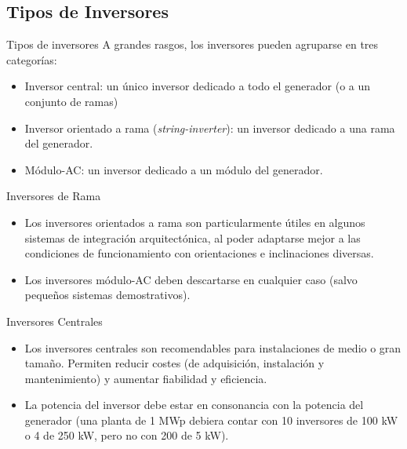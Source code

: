 \documentclass[xcolor={usenames,svgnames,dvipsnames}]{beamer}
\begin{document}
\subsection{Tipos de Inversores}
\label{sec-2-2}
\begin{frame}[label=sec-2-2-1]{Tipos de inversores}
A grandes rasgos, los inversores pueden agruparse en tres categorías:

\begin{itemize}
\item \alert{Inversor central}: un único inversor dedicado a todo el generador (o
a un conjunto de ramas)

\item \alert{Inversor orientado a rama} (\emph{string-inverter}): un inversor dedicado
a una rama del generador.

\item \alert{Módulo-AC}: un inversor dedicado a un módulo del generador.
\end{itemize}
\end{frame}

\begin{frame}[label=sec-2-2-2]{Inversores de Rama}
\begin{itemize}
\item Los \alert{inversores orientados a rama} son particularmente útiles en
algunos sistemas de integración arquitectónica, al poder adaptarse
mejor a las condiciones de funcionamiento con orientaciones e
inclinaciones diversas.

\item Los inversores \alert{módulo-AC} deben descartarse en cualquier caso (salvo
pequeños sistemas demostrativos).
\end{itemize}
\end{frame}

\begin{frame}[label=sec-2-2-3]{Inversores Centrales}
\begin{itemize}
\item Los \alert{inversores centrales} son recomendables para instalaciones de
medio o gran tamaño. Permiten reducir costes (de adquisición,
instalación y mantenimiento) y aumentar fiabilidad y eficiencia.

\item \alert{La potencia del inversor debe estar en consonancia con la potencia
del generador} (una planta de 1 MWp debiera contar con 10 inversores
de 100 kW o 4 de 250 kW, pero no con 200 de 5 kW).
\end{itemize}
\end{frame}
\end{document}
